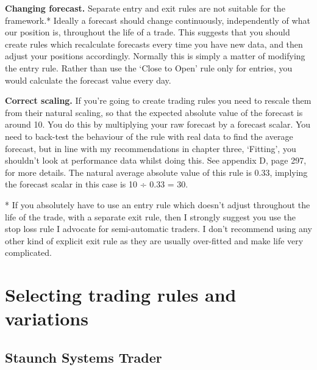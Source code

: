 \noindent\textbf{Changing forecast.} Separate entry and exit rules are not suitable for the framework.* Ideally a forecast should change continuously, independently of what our position is, throughout the life of a trade. This suggests that you should create rules which recalculate forecasts every time you have new data, and then adjust your positions accordingly. Normally this is simply a matter of modifying the entry rule. Rather than use the ‘Close to Open' rule only for entries, you would calculate the forecast value every day.

\noindent\textbf{Correct scaling.} If you're going to create trading rules you need to rescale them from their natural scaling, so that the expected absolute value of the forecast is around 10. You do this by multiplying your raw forecast by a forecast scalar. You need to back-test the behaviour of the rule with real data to find the average forecast, but in line with my recommendations in chapter three, ‘Fitting', you shouldn't look at performance data whilst doing this. See appendix D, page 297, for more details. The natural average absolute value of this rule is 0.33, implying the forecast scalar in this case is 10 ÷ 0.33 = 30.

* If you absolutely have to use an entry rule which doesn't adjust throughout the life of the trade, with a separate exit rule, then I strongly suggest you use the stop loss rule I advocate for semi-automatic traders. I don't recommend using any other kind of explicit exit rule as they are usually over-fitted and make life very complicated.

\section*{Selecting trading rules and variations}  {}

\subsection*{Staunch Systems Trader}

